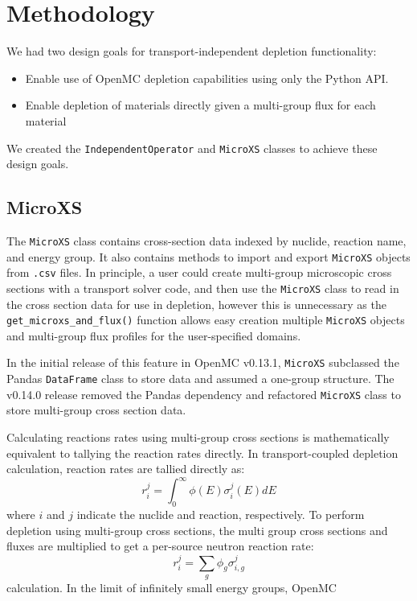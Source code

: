 \section{Methodology}
    \label{sec:methods}
    We had two design goals for transport-independent depletion functionality:
    \begin{itemize}
        \item Enable use of OpenMC depletion capabilities using only the Python API.
        \item Enable depletion of materials directly given a multi-group flux
            for each material 
    \end{itemize}
    
    We created the \verb.IndependentOperator. and \verb.MicroXS. classes to
    achieve these design goals.    

    \subsection{MicroXS}
        \label{sub:microxs}
        The \verb.MicroXS. class contains cross-section data indexed by nuclide,
        reaction name, and energy group. It also contains methods to import and
        export \verb.MicroXS. objects from \verb,.csv, files. In principle, a
        user could create multi-group microscopic cross sections with a
        transport solver code, and then use the \verb.MicroXS.  class to read in
        the cross section data for use in depletion, however this is unnecessary
        as the \verb.get_microxs_and_flux(). function allows easy creation
        multiple \verb.MicroXS. objects and multi-group flux profiles for the
        user-specified domains.

        In the initial release of this feature in OpenMC v0.13.1, \verb.MicroXS.
        subclassed the Pandas \verb.DataFrame. class to store data and assumed a
        one-group structure. The v0.14.0 release removed the Pandas dependency
        and refactored \verb.MicroXS. class to store multi-group cross section
        data.
        
        Calculating reactions rates using multi-group cross sections is
        mathematically equivalent to tallying the reaction rates directly. In
        transport-coupled depletion calculation, reaction rates are tallied
        directly as:
        \begin{equation}
            \label{eq:cont-rxn-rate}
            r^j_{i} = \int_0^\infty \phi(E) \sigma^j_i(E) dE
        \end{equation}
        where $i$ and $j$ indicate the nuclide and reaction, respectively.
            To perform depletion using multi-group cross sections, the multi group
        cross sections and fluxes are multiplied to get a per-source neutron
        reaction rate:
        \begin{equation}
            \label{eq:mg-rxn-rate}
            r^j_{i} = \sum_{g} \phi_{g} \sigma^{j}_{i,g} 
        \end{equation}
        calculation. In the limit of infinitely small energy groups,  OpenMC

